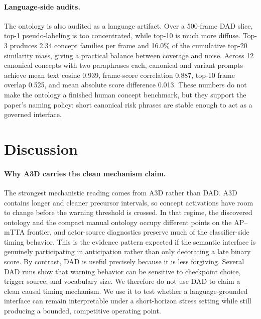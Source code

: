 \documentclass[11pt]{article}
\begin{document}
\paragraph{Language-side audits.}
The ontology is also audited as a language artifact. Over a 500-frame DAD slice,
top-1 pseudo-labeling is too concentrated, while top-10 is much more diffuse.
Top-3 produces 2.34 concept families per frame and 16.0\% of the cumulative
top-20 similarity mass, giving a practical balance between coverage and noise.
Across 12 canonical concepts with two paraphrases each, canonical and variant
prompts achieve mean text cosine 0.939, frame-score correlation 0.887, top-10
frame overlap 0.525, and mean absolute score difference 0.013. These numbers do
not make the ontology a finished human concept benchmark, but they support the
paper's naming policy: short canonical risk phrases are stable enough to act as
a governed interface.

\section{Discussion}

\paragraph{Why A3D carries the clean mechanism claim.}
The strongest mechanistic reading comes from A3D rather than DAD. A3D contains
longer and cleaner precursor intervals, so concept activations have room to
change before the warning threshold is crossed. In that regime, the discovered
ontology and the compact manual ontology occupy different points on the
AP--mTTA frontier, and actor-source diagnostics preserve much of the
classifier-side timing behavior. This is the evidence pattern expected if the
semantic interface is genuinely participating in anticipation rather than only
decorating a late binary score. By contrast, DAD is useful precisely because it
is less forgiving. Several DAD runs show that warning behavior can be sensitive
to checkpoint choice, trigger source, and vocabulary size. We therefore do not
use DAD to claim a clean causal timing mechanism. We use it to test whether a
language-grounded interface can remain interpretable under a short-horizon
stress setting while still producing a bounded, competitive operating point.
\end{document}
